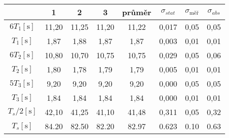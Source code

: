 \begin{tabular}{cccccccc}																														\toprule
						&	1		&	2		&	3		&	průměr	&	$\sigma_{stat}$	&	$\sigma_{\text{měř}}$	&	$\sigma_{abs}$	\\	\midrule
$6 T_1   [\si{\second}]$&	11,20	&	11,25	&	11,20	&	11,22	&	0,017			&	0,05					&	0,05			\\	
$  T_1   [\si{\second}]$&	1,87	&	1,88	&	1,87	&	1,87	&	0,003			&	0,01					&	0,01			\\	\midrule
$6 T_2   [\si{\second}]$&	10,80	&	10,70	&	10,75	&	10,75	&	0,029			&	0,05					&	0,06			\\	
$  T_2   [\si{\second}]$&	1,80	&	1,78	&	1,79	&	1,79	&	0,005			&	0,01					&	0,01			\\	\midrule
$5 T_3   [\si{\second}]$&	9,20	&	9,20	&	9,20	&	9,20	&	0,000			&	0,05					&	0,05			\\	
$  T_3   [\si{\second}]$&	1,84	&	1,84	&	1,84	&	1,84	&	0,000			&	0,01					&	0,01			\\	\midrule
$  T_s/2 [\si{\second}]$&	42,10	&	41,25	&	41,10	&	41,48	&	0,311			&	0,05					&	0,32			\\	
$  T_s   [\si{\second}]$&   84.20   &   82.50   &   82.20   &   82.97   &   0.623           &   0.10                    &   0.63            \\  \bottomrule

\end{tabular}